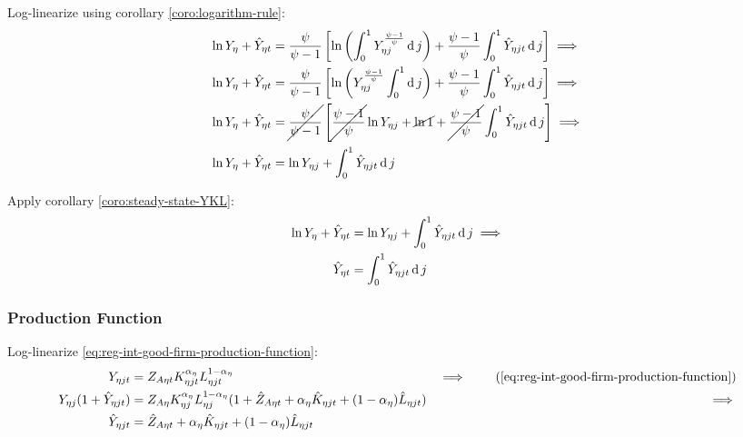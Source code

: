 \documentclass[../thesis.tex]{subfiles}
\begin{document}
Log-linearize using corollary \ref{coro:logarithm-rule}:
\begin{align}
	\ln{Y_{\eta}} + \hat{Y}_{\eta t} &= \frac{\psi}{\psi-1} \left[ \ln \left( \int_{0}^{1} Y_{\eta j}^{\frac{\psi-1}{\psi}} \operatorname{d} j \right) + \frac{\psi-1}{\psi} \int_{0}^{1} \hat{Y}_{\eta jt} \operatorname{d} j \right] \implies \nonumber
	\\
	\ln{Y_{\eta}} + \hat{Y}_{\eta t} &= \frac{\psi}{\psi-1} \left[ \ln \left( Y_{\eta j}^{\frac{\psi-1}{\psi}} \int_{0}^{1} \operatorname{d} j \right) + \frac{\psi-1}{\psi} \int_{0}^{1} \hat{Y}_{\eta jt} \operatorname{d} j \right] \implies \nonumber
	\\
	\ln{Y_{\eta}} + \hat{Y}_{\eta t} &= \cancel{\frac{\psi}{\psi-1}} \left[ \cancel{\frac{\psi-1}{\psi}} \ln{Y_{\eta j}} + \cancel{\ln1} + \cancel{\frac{\psi-1}{\psi}} \int_{0}^{1} \hat{Y}_{\eta jt} \operatorname{d} j \right] \implies \nonumber
	\\
	\ln{Y_{\eta}} + \hat{Y}_{\eta t} &= \ln{Y_{\eta j}} + \int_{0}^{1} \hat{Y}_{\eta jt} \operatorname{d} j \nonumber
\end{align}

Apply corollary \ref{coro:steady-state-YKL}:
\begin{align}
	\ln{Y_{\eta}} + \hat{Y}_{\eta t} &= \ln{Y_{\eta j}} + \int_{0}^{1} \hat{Y}_{\eta jt} \operatorname{d} j \implies \nonumber \\
	\hat{Y}_{\eta t} &= \int_{0}^{1} \hat{Y}_{\eta jt} \operatorname{d} j 
	\label{eq:reg-ll-final-goods-firm-bundle-rule}
\end{align}


\subsubsection*{Production Function}

Log-linearize \ref{eq:reg-int-good-firm-production-function}:
\begin{alignat}{2}
	Y_{\eta jt} &= Z_{A\eta t} K_{\eta jt}^{\alpha_{\eta}} L_{\eta jt}^{1-{\alpha_{\eta}}} &\implies \tag{\ref{eq:reg-int-good-firm-production-function}} \\
	Y_{\eta j} (1+ \hat{Y}_{\eta jt}) &= Z_{A\eta} K_{\eta j}^{\alpha_{\eta}} L_{\eta j}^{1-{\alpha_{\eta}}} (1+ \hat{Z}_{A\eta t} + {\alpha_{\eta}} \hat{K}_{\eta jt} + (1-{\alpha_{\eta}}) \hat{L}_{\eta jt}) &\implies \nonumber \\
	\hat{Y}_{\eta jt} &= \hat{Z}_{A\eta t} + {\alpha_{\eta}} \hat{K}_{\eta jt} + (1-{\alpha_{\eta}}) \hat{L}_{\eta jt} \label{eq:reg-ll-int-good-firm-production-function}
\end{alignat}
\end{document}
